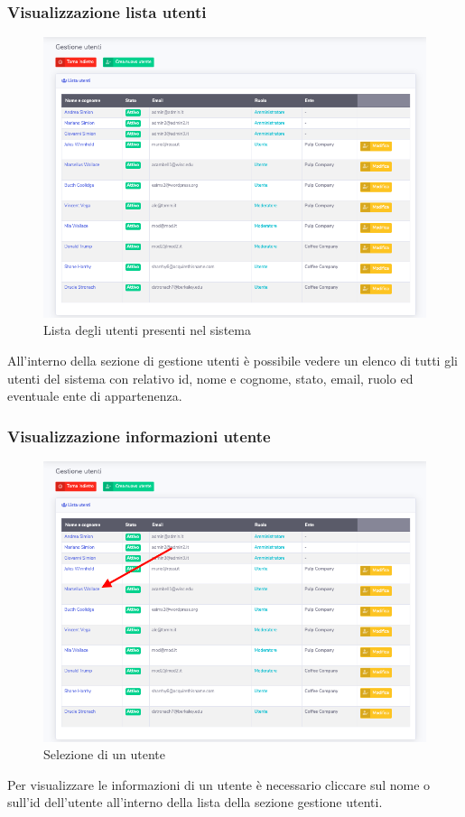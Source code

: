 	\subsubsection{Visualizzazione lista utenti}	
		\begin{figure}[H]
		\centering
		\includegraphics[scale=0.600]{res/images/admin/listaUtenti.png}
		\caption{Lista degli utenti presenti nel sistema}
	\end{figure}
	All'interno della sezione di gestione utenti è possibile vedere un elenco di tutti gli utenti del sistema con relativo id, nome e cognome, stato, email, ruolo ed eventuale ente di appartenenza. 

	\subsubsection{Visualizzazione informazioni utente}	

		\begin{figure}[H]
		\centering
		\includegraphics[scale=0.600]{res/images/admin/selDettUtente.png}
		\caption{Selezione di un utente}
	\end{figure}
	Per visualizzare le informazioni di un utente è necessario cliccare sul nome o sull'id dell'utente all'interno della lista della sezione gestione utenti.

